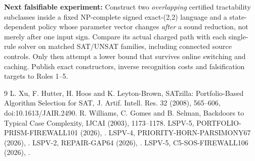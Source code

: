 \documentclass[11pt]{article}
\begin{document}
\par\noindent\textbf{Next falsifiable experiment:}
Construct two \emph{overlapping} certified tractability
subclasses inside a fixed NP-complete signed exact-(2,2)
language and a state-dependent policy whose parameter vector
changes \emph{after} a sound reduction, not merely after one
input sign. Compare its actual charged path with each
single-rule solver on matched SAT/UNSAT families, including
connected source controls. Only then attempt a lower bound
that survives online switching and caching.
Publish exact constructors, inverse recognition costs and
falsification targets to Roles 1--5.

\begin{thebibliography}{9}
 L. Xu, F. Hutter, H. Hoos and K. Leyton-Brown,
SATzilla: Portfolio-Based Algorithm Selection for SAT,
J. Artif. Intell. Res. 32 (2008), 565--606,
doi:10.1613/JAIR.2490.
 R. Williams, C. Gomes and B. Selman,
Backdoors to Typical Case Complexity, IJCAI (2003), 1173--1178.
 LSPV-5, PORTFOLIO-PRISM-FIREWALL101 (2026),
.
 LSPV-4, PRIORITY-HORN-PARSIMONY67 (2026),
.
 LSPV-2, REPAIR-GAP64 (2026),
.
 LSPV-5, C5-SOS-FIREWALL106 (2026),
.
\end{thebibliography}
\end{document}

